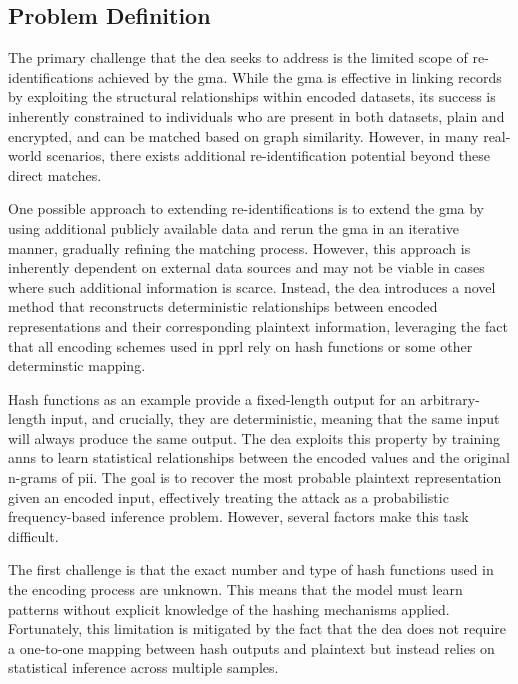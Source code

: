 \subsection{Problem Definition} \label{sec:problemdefinition}

The primary challenge that the \ac{dea} seeks to address is the limited scope of re-identifications achieved by the \ac{gma}.
While the \ac{gma} is effective in linking records by exploiting the structural relationships within encoded datasets, its success is inherently constrained to individuals who are present in both datasets, plain and encrypted, and can be matched based on graph similarity.
However, in many real-world scenarios, there exists additional re-identification potential beyond these direct matches.

One possible approach to extending re-identifications is to extend the \ac{gma} by using additional publicly available data and rerun the \ac{gma} in an iterative manner, gradually refining the matching process.
However, this approach is inherently dependent on external data sources and may not be viable in cases where such additional information is scarce.
Instead, the \ac{dea} introduces a novel method that reconstructs deterministic relationships between encoded representations and their corresponding plaintext information, leveraging the fact that all encoding schemes used in \ac{pprl} rely on hash functions or some other determinstic mapping.

Hash functions as an example provide a fixed-length output for an arbitrary-length input, and crucially, they are deterministic, meaning that the same input will always produce the same output.
The \ac{dea} exploits this property by training \ac{ann}s to learn statistical relationships between the encoded values and the original n-grams of \ac{pii}.
The goal is to recover the most probable plaintext representation given an encoded input, effectively treating the attack as a probabilistic frequency-based inference problem.
However, several factors make this task difficult.

The first challenge is that the exact number and type of hash functions used in the encoding process are unknown.
This means that the model must learn patterns without explicit knowledge of the hashing mechanisms applied.
Fortunately, this limitation is mitigated by the fact that the \ac{dea} does not require a one-to-one mapping between hash outputs and plaintext but instead relies on statistical inference across multiple samples.

